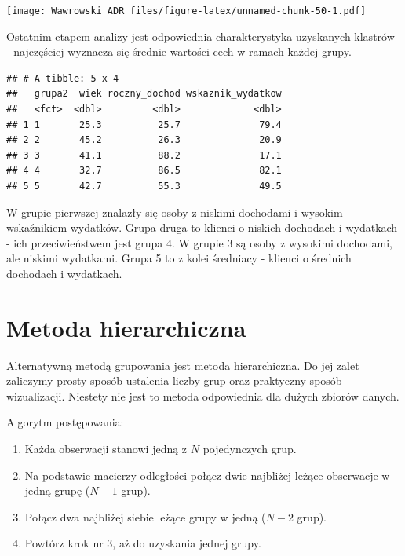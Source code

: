 \documentclass[
]{book}
\newenvironment{Shaded}{\begin{snugshade}}{\end{snugshade}}
\newcommand{\DataTypeTok}[1]{\textcolor[rgb]{0.13,0.29,0.53}{#1}}
\newcommand{\KeywordTok}[1]{\textcolor[rgb]{0.13,0.29,0.53}{\textbf{#1}}}
\newcommand{\NormalTok}[1]{#1}
\newcommand{\OperatorTok}[1]{\textcolor[rgb]{0.81,0.36,0.00}{\textbf{#1}}}
\newcommand{\StringTok}[1]{\textcolor[rgb]{0.31,0.60,0.02}{#1}}
\providecommand{\tightlist}{%
  \setlength{\itemsep}{0pt}\setlength{\parskip}{0pt}}
\begin{document}
\texttt{[image: Wawrowski\_ADR\_files/figure-latex/unnamed-chunk-50-1.pdf]}

Ostatnim etapem analizy jest odpowiednia charakterystyka uzyskanych klastrów - najczęściej wyznacza się średnie wartości cech w ramach każdej grupy.

\begin{Shaded}
\end{Shaded}

\begin{verbatim}
## # A tibble: 5 x 4
##   grupa2  wiek roczny_dochod wskaznik_wydatkow
##   <fct>  <dbl>         <dbl>             <dbl>
## 1 1       25.3          25.7              79.4
## 2 2       45.2          26.3              20.9
## 3 3       41.1          88.2              17.1
## 4 4       32.7          86.5              82.1
## 5 5       42.7          55.3              49.5
\end{verbatim}

W grupie pierwszej znalazły się osoby z niskimi dochodami i wysokim wskaźnikiem wydatków. Grupa druga to klienci o niskich dochodach i wydatkach - ich przeciwieństwem jest grupa 4. W grupie 3 są osoby z wysokimi dochodami, ale niskimi wydatkami. Grupa 5 to z kolei średniacy - klienci o średnich dochodach i wydatkach.

\hypertarget{metoda-hierarchiczna}{%
\section{Metoda hierarchiczna}\label{metoda-hierarchiczna}}

Alternatywną metodą grupowania jest metoda hierarchiczna. Do jej zalet zaliczymy prosty sposób ustalenia liczby grup oraz praktyczny sposób wizualizacji. Niestety nie jest to metoda odpowiednia dla dużych zbiorów danych.

Algorytm postępowania:

\begin{enumerate}
\def\labelenumi{\arabic{enumi}.}
\tightlist
\item
  Każda obserwacji stanowi jedną z \(N\) pojedynczych grup.
\item
  Na podstawie macierzy odległości połącz dwie najbliżej leżące obserwacje w jedną grupę (\(N-1\) grup).
\item
  Połącz dwa najbliżej siebie leżące grupy w jedną (\(N-2\) grup).
\item
  Powtórz krok nr 3, aż do uzyskania jednej grupy.
\end{enumerate}
\end{document}
